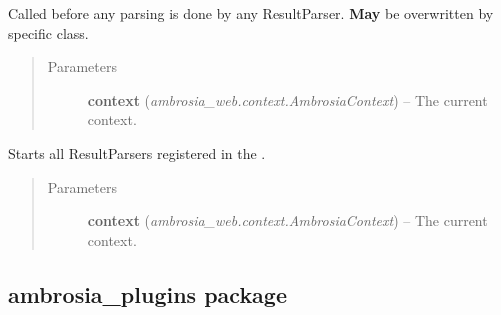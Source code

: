 \documentclass[letterpaper,10pt,english]{sphinxmanual}
\begin{document}
\begin{fulllineitems}
\begin{fulllineitems}
\begin{quote}
\begin{description}
\end{description}\end{quote}

\end{fulllineitems}


\begin{fulllineitems}
\label{ambrosia:ambrosia.ResultParser.prepare}
Called before any parsing is done by any ResultParser. \textbf{May} be overwritten by specific class.
\begin{quote}\begin{description}
\item[{Parameters}] \leavevmode
\textbf{context} (\emph{ambrosia\_web.context.AmbrosiaContext}) -- The current context.

\end{description}\end{quote}

\end{fulllineitems}


\begin{fulllineitems}
\label{ambrosia:ambrosia.ResultParser.start_parsers}
Starts all ResultParsers registered in the .
\begin{quote}\begin{description}
\item[{Parameters}] \leavevmode
\textbf{context} (\emph{ambrosia\_web.context.AmbrosiaContext}) -- The current context.

\end{description}\end{quote}

\end{fulllineitems}


\end{fulllineitems}



\subsection{ambrosia\_plugins package}
\label{ambrosia_plugins:ambrosia-plugins-package}\label{ambrosia_plugins::doc}
\end{document}
